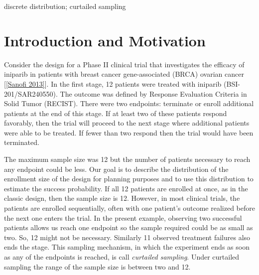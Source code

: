 \documentclass[12pt]{article}         %
\begin{document}
\bigskip

  discrete distribution; curtailed sampling


\thispagestyle{empty}
\setcounter{page}{1}

\section            {Introduction and Motivation}



Consider the design for a Phase II clinical trial that investigates the 
efficacy of iniparib in patients with breast cancer gene-associated (BRCA) 
ovarian cancer [\ref{Sanofi 2013}]. In the first stage, 12 patients were 
treated with iniparib (BSI-201/SAR240550). The outcome was defined by 
Response Evaluation Criteria in Solid Tumor (RECIST). There were two 
endpoints: terminate or enroll additional patients at the end of this 
stage. If at least two of
these patients respond favorably, then the trial will proceed to the next 
stage where additional patients were able to be treated. If fewer than two 
respond then the trial would have been terminated. 

The maximum sample size was 12 but the number of patients necessary to 
reach any endpoint could be less. Our goal is to describe the distribution of 
the enrollment size of the design for 
planning purposes and to use this distribution to estimate the
success probability.  If all 12 patients are enrolled at once, 
as in the classic 
design, then the sample size is 12. However, in most clinical trials, the 
patients are enrolled sequentially, often with one patient's outcome realized 
before the next one enters the trial. In the present example, observing two 
successful patients allows us reach one endpoint so the sample required 
could be as small as two. So, 12 might not be necessary. Similarly 11 
observed treatment failures also ends the stage. This sampling mechanism, in 
which the experiment ends as soon as any of the endpoints is reached, is 
call {\em curtailed sampling}. Under curtailed sampling the range of the 
sample size is between two and 12.
\end{document}
